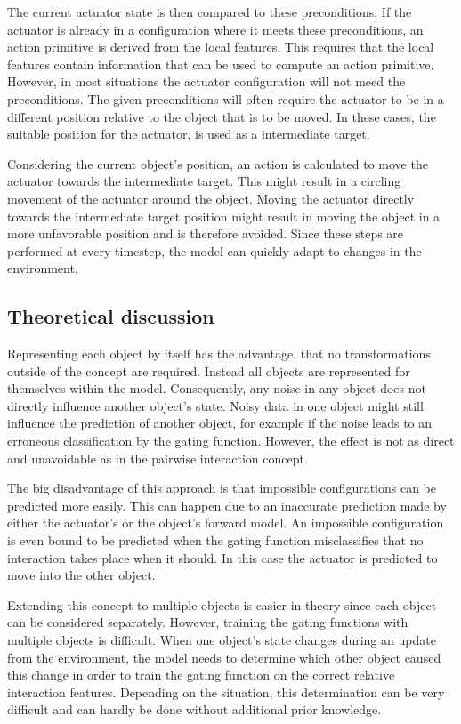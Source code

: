 The current actuator state is then compared to these preconditions. If the actuator is already in a configuration where it meets these preconditions, an action primitive is derived from the local features. This requires that the local features contain information that can be used to compute an action primitive.
However, in most situations the actuator configuration will not meed the preconditions. The given preconditions will often require the actuator to be in a different position relative to the object that is to be moved. In these cases, the suitable position for the actuator, is used as a intermediate target. 

Considering the current object's position, an action is calculated to move the actuator towards the intermediate target. This might result in a circling movement of the actuator around the object. Moving the actuator directly towards the intermediate target position might result in moving the object in a more unfavorable position and is therefore avoided. Since these steps are performed at every timestep, the model can quickly adapt to changes in the environment.
	
\subsection{Theoretical discussion}

Representing each object by itself has the advantage, that no transformations outside of the concept are required. Instead all objects are represented for themselves within the model. 
Consequently, any noise in any object does not directly influence another object's state. Noisy data in one object might still influence the prediction of another object, for example if the noise leads to an erroneous classification by the gating function. However, the effect is not as direct and unavoidable as in the pairwise interaction concept.

The big disadvantage of this approach is that impossible configurations can be predicted more easily. This can happen due to an inaccurate prediction made by either the actuator's or the object's forward model.
An impossible configuration is even bound to be predicted when the gating function misclassifies that no interaction takes place when it should. In this case the actuator is predicted to move into the other object.

Extending this concept to multiple objects is easier in theory since each object can be considered separately. However, training the gating functions with multiple objects is difficult. When one object's state changes during an update from the environment, the model needs to determine which other object caused this change in order to train the gating function on the correct relative interaction features. Depending on the situation, this determination can be very difficult and can hardly be done without additional prior knowledge. 

